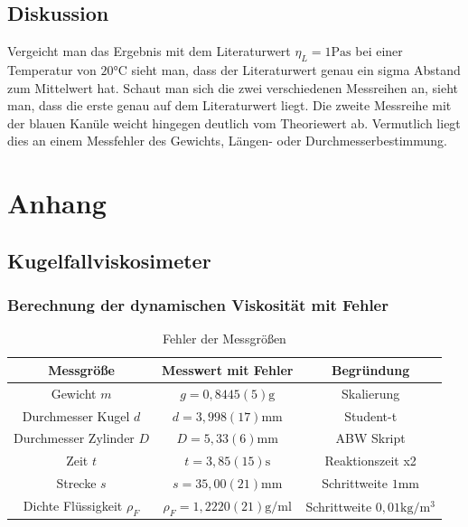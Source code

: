 \documentclass[11pt, a4paper]{article}
\begin{document}
    \subsection{Diskussion}
    Vergeicht man das Ergebnis mit dem Literaturwert $\eta_L = 1 \si{\pascal\second}$ \cite[Abb. 8]{VIS} bei einer Temperatur
    von $20 \si{\celsius}$ sieht man, dass der Literaturwert genau ein sigma Abstand zum Mittelwert hat.
    Schaut man sich die zwei verschiedenen Messreihen an, sieht man, dass die erste genau auf dem Literaturwert
    liegt. Die zweite Messreihe mit der blauen Kanüle weicht hingegen deutlich vom Theoriewert ab.
    Vermutlich liegt dies an einem Messfehler des Gewichts, Längen-
    oder Durchmesserbestimmung. 



    \section{Anhang}
    \subsection{Kugelfallviskosimeter}

    \subsubsection{Berechnung der dynamischen Viskosität mit Fehler} \label{sec:dynvisc}
    
    \begin{table}
       \begin{adjustwidth}{-5cm}{-5cm}
            \centering
            \begin{tabular}{c c c}
                Messgröße & Messwert mit Fehler & Begründung \\ \hline
                
                Gewicht $m$ & $g = 0,8445(5) \si{\gram}$ & Skalierung \\
                Durchmesser Kugel $d$ & $d = 3,998(17) \si{\milli\meter}$ & Student-t \\
                Durchmesser Zylinder $D$ & $D = 5,33(6) \si{\milli\meter}$ & ABW Skript \cite[Tabelle 6]{ABW} \\
                Zeit $t$ & $t = 3,85(15) \si{\second}$ & Reaktionszeit x2\\
                Strecke $s$ & $s = 35,00(21) \si{\milli\metre}$ & Schrittweite $1 \si{\milli\metre}$ \\
                Dichte Flüssigkeit $\rho_F$ & $\rho_F = 1,2220(21)  \si{\gram\per\milli\litre}$ & Schrittweite $0,01 \si{\kilogram\per\cubic\metre}$ \\

            \end{tabular}
        \end{adjustwidth}
        \label{tab:errors}
        \caption[]{Fehler der Messgrößen}
    \end{table}
    
\end{document}
